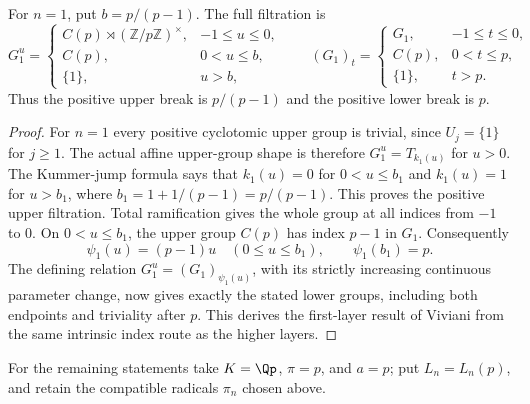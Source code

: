 \begin{theorem}
\label{ft:first-layer-filtration}
\leanok{}
For $n=1$, put $b=p/(p-1)$. The full filtration is
\[
 G_1^u=\begin{cases}
 C(p)\rtimes(\mathbb Z/p\mathbb Z)^\times,&-1\leq u\leq0,\\
 C(p),&0<u\leq b,\\
 \{1\},&u>b,
 \end{cases}
 \qquad
 (G_1)_t=\begin{cases}
 G_1,&-1\leq t\leq0,\\
 C(p),&0<t\leq p,\\
 \{1\},&t>p.
 \end{cases}
\]
Thus the positive upper break is $p/(p-1)$ and the positive lower break
is $p$.
\end{theorem}
\begin{proof}
For $n=1$ every positive cyclotomic upper group is trivial, since
$U_j=\{1\}$ for $j\geq1$. The actual affine upper-group shape is
therefore $G_1^u=T_{k_1(u)}$ for $u>0$.
The Kummer-jump formula says that $k_1(u)=0$ for $0<u\leq b_1$
and $k_1(u)=1$ for $u>b_1$, where
$b_1=1+1/(p-1)=p/(p-1)$. This proves the positive upper filtration.
Total ramification gives the whole group at all indices from $-1$ to $0$.
On $0<u\leq b_1$, the upper group $C(p)$ has index $p-1$ in $G_1$.
Consequently
\[
 \psi_1(u)=(p-1)u\quad(0\leq u\leq b_1),\qquad
 \psi_1(b_1)=p.
\]
The defining relation $G_1^u=(G_1)_{\psi_1(u)}$, with its strictly
increasing continuous parameter change, now gives exactly the stated
lower groups, including both endpoints and triviality after $p$.
This derives the first-layer result of Viviani from the same intrinsic
index route as the higher layers.
\end{proof}

For the remaining statements take $K=\Qp$, $\pi=p$, and $a=p$; put
$L_n=L_n(p)$, and retain the compatible radicals $\pi_n$ chosen above.

